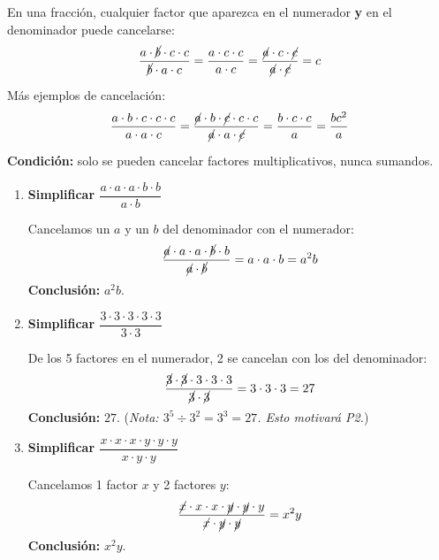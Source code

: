 \documentclass[11pt, letterpaper]{article}
\begin{document}
\begin{tcolorbox}[importantbox, title={Simplificación algebraica por cancelación}]
En una fracción, cualquier factor que aparezca en el numerador \textbf{y} en el denominador puede cancelarse:
$$\frac{a \cdot \cancel{b} \cdot c \cdot c}{\cancel{b} \cdot a \cdot c} = \frac{a \cdot c \cdot c}{a \cdot c} = \frac{\cancel{a} \cdot c \cdot \cancel{c}}{\cancel{a} \cdot \cancel{c}} = c$$

Más ejemplos de cancelación:
$$\frac{a \cdot b \cdot c \cdot c \cdot c}{a \cdot a \cdot c} = \frac{\cancel{a} \cdot b \cdot \cancel{c} \cdot c \cdot c}{\cancel{a} \cdot a \cdot \cancel{c}} = \frac{b \cdot c \cdot c}{a} = \frac{bc^2}{a}$$

\textbf{Condición:} solo se pueden cancelar factores multiplicativos, nunca sumandos.
\end{tcolorbox}

\begin{tcolorbox}[examplebox, title={Ejemplos — simplificación con letras y números}]
\begin{enumerate}[label=\textbf{Ej. \arabic*.}, leftmargin=*, itemsep=12pt]
\item \textbf{Simplificar $\dfrac{a \cdot a \cdot a \cdot b \cdot b}{a \cdot b}$}

Cancelamos un $a$ y un $b$ del denominador con el numerador:
$$\frac{\cancel{a} \cdot a \cdot a \cdot \cancel{b} \cdot b}{\cancel{a} \cdot \cancel{b}} = a \cdot a \cdot b = a^2 b$$
\textbf{Conclusión:} $a^2 b$.

\item \textbf{Simplificar $\dfrac{3 \cdot 3 \cdot 3 \cdot 3 \cdot 3}{3 \cdot 3}$}

De los 5 factores en el numerador, 2 se cancelan con los del denominador:
$$\frac{\cancel{3}\cdot\cancel{3}\cdot 3\cdot 3\cdot 3}{\cancel{3}\cdot\cancel{3}} = 3\cdot 3\cdot 3 = 27$$
\textbf{Conclusión:} $27$. \quad (\textit{Nota: $3^5 \div 3^2 = 3^3 = 27$. Esto motivará P2.})

\item \textbf{Simplificar $\dfrac{x \cdot x \cdot x \cdot y \cdot y \cdot y}{x \cdot y \cdot y}$}

Cancelamos 1 factor $x$ y 2 factores $y$:
$$\frac{\cancel{x}\cdot x\cdot x\cdot \cancel{y}\cdot\cancel{y}\cdot y}{\cancel{x}\cdot\cancel{y}\cdot\cancel{y}} = x^2 y$$
\textbf{Conclusión:} $x^2 y$.
\end{enumerate}
\end{tcolorbox}
\end{document}
